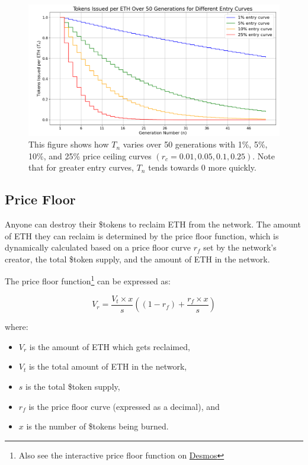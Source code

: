 \documentclass{article}
\begin{document}
\clearpage
\begin{figure}[h]
  \centering
  \includegraphics[width=\textwidth]{figures/multi-entry-curves.png}
  \caption{This figure shows how $T_n$ varies over 50 generations with 1\%, 5\%, 10\%, and 25\% price ceiling curves $(r_c = 0.01, 0.05, 0.1, 0.25)$. Note that for greater entry curves, $T_n$ tends towards 0 more quickly.}
\end{figure}

\subsection{Price Floor}

Anyone can destroy their \$tokens to reclaim ETH from the network. The amount of ETH they can reclaim is determined by the price floor function, which is dynamically calculated based on a price floor curve $r_f$ set by the network's creator, the total \$token supply, and the amount of ETH in the network.

The price floor function\footnote{Also see the interactive price floor function on \href{https://www.desmos.com/calculator/9pewqesyj5}{Desmos}} can be expressed as:

\begin{equation}
  V_r = \frac{V_t \times x}{s}\left(\left(1-r_f\right)+\frac{r_f \times x}{s}\right)
\end{equation}

where:
\begin{itemize}
  \item $V_r$ is the amount of ETH which gets reclaimed,
  \item $V_t$ is the total amount of ETH in the network,
  \item $s$ is the total \$token supply,
  \item $r_f$ is the price floor curve (expressed as a decimal), and
  \item $x$ is the number of \$tokens being burned.
\end{itemize}
\end{document}
